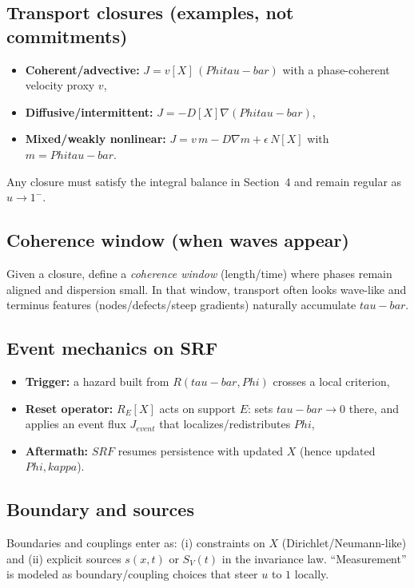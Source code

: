 \documentclass[12pt]{article}
\newcommand{\FoldDensity}{\Phi}
\newcommand{\FoldTime}{\bar{\tau}}
\newcommand{\Threshold}{\kappa}
\newcommand{\Release}{R}
\newcommand{\SRF}{\mathcal{F}_{\mathrm{SR}}}
\def\FoldDensity{Phi}%
\def\FoldTime{tau-bar}%
\def\Threshold{kappa}%
\def\SRF{SRF}%
\def\Release{R}%
\def\bar#1{#1}%
\def\mathcal#1{#1}%
\def\mathrm#1{#1}%
\begin{document}
\subsection{Transport closures (examples, not commitments)}
\begin{itemize}
  \item \textbf{Coherent/advective:} $J = v[X]\,(\FoldDensity\FoldTime)$ with a phase-coherent velocity proxy $v$,
  \item \textbf{Diffusive/intermittent:} $J = -D[X]\nabla(\FoldDensity\FoldTime)$,
  \item \textbf{Mixed/weakly nonlinear:} $J = v\,m - D\nabla m + \epsilon\,\mathcal{N}[X]$ with $m=\FoldDensity\FoldTime$.
\end{itemize}
Any closure must satisfy the integral balance in Section~4 and remain regular as $u\to 1^{-}$.

\subsection{Coherence window (when waves appear)}
Given a closure, define a \emph{coherence window} (length/time) where phases remain aligned and dispersion small.
In that window, transport often looks wave-like and terminus features (nodes/defects/steep gradients) naturally accumulate $\FoldTime$.

\subsection{Event mechanics on SRF}
\begin{itemize}
  \item \textbf{Trigger:} a hazard built from $\Release(\FoldTime,\FoldDensity)$ crosses a local criterion,
  \item \textbf{Reset operator:} $\mathcal{R}_E[X]$ acts on support $E$: sets $\FoldTime\to 0$ there, and applies an event flux $J_{\mathrm{event}}$ that localizes/redistributes $\FoldDensity$,
  \item \textbf{Aftermath:} $\SRF$ resumes persistence with updated $X$ (hence updated $\FoldDensity,\Threshold$).
\end{itemize}

\subsection{Boundary and sources}
Boundaries and couplings enter as: (i) constraints on $X$ (Dirichlet/Neumann-like) and (ii) explicit sources $s(x,t)$ or $S_V(t)$ in the invariance law.
``Measurement'' is modeled as boundary/coupling choices that steer $u$ to $1$ locally.
\end{document}
